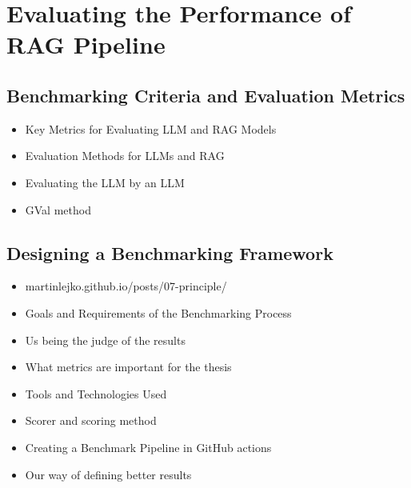 \chapter{Evaluating the Performance of RAG Pipeline}

\section{Benchmarking Criteria and Evaluation Metrics}
\begin{itemize}
    \item Key Metrics for Evaluating LLM and RAG Models
    \item Evaluation Methods for LLMs and RAG
    \item Evaluating the LLM by an LLM
    \item GVal method
\end{itemize}

\section{Designing a Benchmarking Framework}
\begin{itemize}
    \item martinlejko.github.io/posts/07-principle/
    \item Goals and Requirements of the Benchmarking Process
    \item Us being the judge of the results
    \item What metrics are important for the thesis
    \item Tools and Technologies Used
    \item Scorer and scoring method
    \item Creating a Benchmark Pipeline in GitHub actions
    \item Our way of defining better results
\end{itemize}
